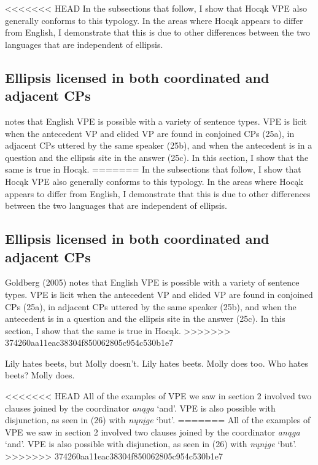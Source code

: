\documentclass[output=paper]{LSP/langsci}
\begin{document}
<<<<<<< HEAD
In the subsections that follow, I show that Hocąk VPE also generally conforms to this typology. In the areas where Hocąk appears to differ from English, I demonstrate that this is due to other differences between the two languages that are independent of ellipsis.

\subsection{Ellipsis licensed in both coordinated and adjacent CPs}

\citet{Goldberg2005} notes that English VPE is possible with a variety of sentence types. VPE is licit when the antecedent VP and elided VP are found in conjoined CPs (25a), in adjacent CPs uttered by the same speaker (25b), and when the antecedent is in a question and the ellipsis site in the answer (25c). In this section, I show that the same is true in Hocąk.
=======
In the subsections that follow, I show that Hoc\k{a}k VPE also generally conforms to this typology. In the areas where Hoc\k{a}k appears to differ from English, I demonstrate that this is due to other differences between the two languages that are independent of ellipsis.

\subsection{Ellipsis licensed in both coordinated and adjacent CPs}

Goldberg (2005) notes that English VPE is possible with a variety of sentence types. VPE is licit when the antecedent VP and elided VP are found in conjoined CPs (25a), in adjacent CPs uttered by the same speaker (25b), and when the antecedent is in a question and the ellipsis site in the answer (25c). In this section, I show that the same is true in Hoc\k{a}k.
>>>>>>> 374260aa11eac38304f850062805c954c530b1e7

\begin{exe}
\ex
\begin{xlist}
\ex
Lily hates beets, but Molly doesn't.
\ex
Lily hates beets. Molly does too.
\ex
Who hates beets? Molly does.
\end{xlist}
\end{exe}

<<<<<<< HEAD
All of the examples of VPE we saw in section 2 involved two clauses joined by the coordinator \emph{anąga} `and'. VPE is also possible with disjunction, as seen in (26) with \emph{nųnįge} `but'.
=======
All of the examples of VPE we saw in section 2 involved two clauses joined by the coordinator \emph{an\k{a}ga} `and'. VPE is also possible with disjunction, as seen in (26) with \emph{n\k{u}n\k{i}ge} `but'.
>>>>>>> 374260aa11eac38304f850062805c954c530b1e7
\end{document}
